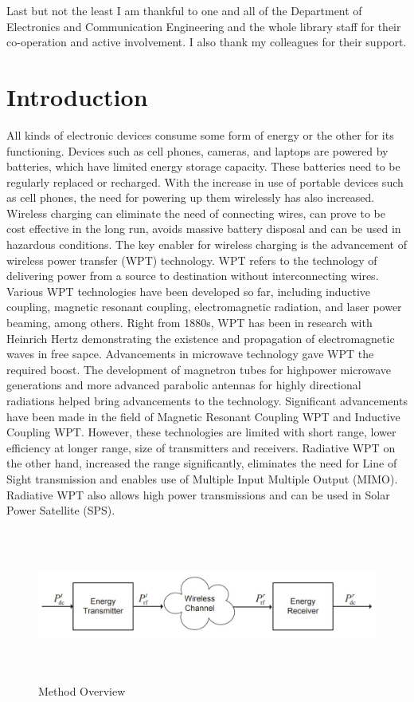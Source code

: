 \documentclass[hidelinks, 12pt]{report}
\begin{document}
Last but not the least I am thankful to one and all of the Department of Electronics and Communication Engineering and the whole library staff for their co-operation and active involvement. I also thank my colleagues for their support.
\hbox{} \newpage 
{} 
\pagestyle{fancy}
\chapter{Introduction}
\justify
All kinds of electronic devices consume some form of energy or the other for its functioning. Devices such as cell phones, cameras, and laptops are powered by batteries, which have limited energy storage capacity. These batteries need to be regularly replaced or recharged. With the increase in use of portable devices such as cell phones, the need for powering up them wirelessly has also increased. Wireless charging can eliminate the need of connecting wires, can prove to be cost effective in the long run, avoids massive battery disposal and can be used in hazardous conditions. The key enabler for wireless charging is the advancement of wireless power transfer (WPT) technology. WPT refers to the technology of delivering power from a source to destination without interconnecting wires. Various WPT technologies have been developed so far, including inductive coupling, magnetic resonant coupling, electromagnetic radiation, and laser power beaming, among others. Right from 1880s, WPT has been in research with Heinrich Hertz demonstrating the existence and propagation of electromagnetic waves in free sapce. Advancements in microwave technology gave WPT the required boost. The development of magnetron tubes for highpower microwave generations and more advanced parabolic antennas for highly directional radiations helped bring advancements to the technology. Significant advancements have been made in the field of Magnetic Resonant Coupling WPT and Inductive Coupling WPT. However, these technologies are limited with short range, lower efficiency at longer range, size of transmitters and receivers. Radiative WPT on the other hand, increased the range significantly, eliminates the need for Line of Sight transmission and enables use of Multiple Input Multiple Output (MIMO). Radiative WPT also allows high power transmissions and can be used in Solar Power Satellite (SPS). 
\begin{figure}[H]
\centering
\includegraphics[width=15cm,height=5cm]{Block.JPG}
\caption[Method Overview]{Method Overview}
\label{Method Overview}
\end{figure}
\end{document}
